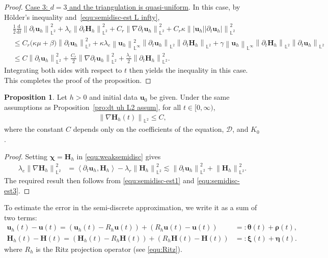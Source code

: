 \documentclass[11pt, reqno]{amsart}
\theoremstyle{definition}
\newtheorem{proposition}[theorem]{Proposition}
\theoremstyle{remark}
\numberwithin{equation}{section}
\newcommand{\bff}{\boldsymbol}
\newcommand{\bb}{\mathbb}
\newcommand{\ddt}{\frac{\mathrm{d}}{\mathrm{d}t}}
\newcommand{\norm}[2]{\left\|{#1}\right\|_{#2}}
\newcommand{\inpro}[2]{\left\langle#1,#2\right\rangle}
\begin{document}
\begin{proof}
\medskip
\noindent
\underline{Case 3: $d=3$ and the triangulation is quasi-uniform}. In this case, by H\"older's inequality and~\eqref{equ:semidisc-est L infty},
\begin{align*}
	&\frac{1}{2} \ddt \norm{\partial_t \bff{u}_h}{\bb{L}^2}^2
	+
	\lambda_e \norm{\partial_t \bff{H}_h}{\bb{L}^2}^2
	+
	C_r \norm{\nabla \partial_t \bff{u}_h}{\bb{L}^2}^2
	+
	C_r\kappa \norm{|\bff{u}_h| |\partial_t \bff{u}_h|}{\bb{L}^2}^2
	\\
	&\leq
	C_r \big(\kappa\mu+\beta\big) \norm{\partial_t \bff{u}_h}{\bb{L}^2}^2
	+
	\kappa \lambda_e \norm{\bff{u}_h}{\bb{L}^\infty}^2
	\norm{\partial_t \bff{u}_h}{\bb{L}^2}
	\norm{\partial_t \bff{H}_h}{\bb{L}^2}
	+
	\gamma \norm{\bff{u}_h}{\bb{L}^\infty}
	\norm{\partial_t \bff{H}_h}{\bb{L}^2}
	\norm{\partial_t \bff{u}_h}{\bb{L}^2}
	\\
	&\leq
	C \norm{\partial_t \bff{u}_h}{\bb{L}^2}^2
	+
	\frac{C_r}{2} \norm{\nabla \partial_t \bff{u}_h}{\bb{L}^2}^2
	+
	\frac{\lambda_e}{2} \norm{\partial_t \bff{H}_h}{\bb{L}^2}^2.
\end{align*}
Integrating both sides with respect to $t$ then yields the inequality in this case.
This completes the proof of the proposition.
\end{proof}

\begin{proposition}
Let $h>0$ and initial data $\bff{u}_0$ be given. Under the same assumptions as Proposition~\ref{pro:dt uh L2 assum}, for all $t\in [0,\infty)$,
\begin{align*}
	\norm{\nabla \bff{H}_h(t)}{\bb{L}^2}
	\leq
	C,
\end{align*}
where the constant $C$ depends only on the coefficients of the equation, $\mathscr{D}$, and $K_0$.
\end{proposition}

\begin{proof}
Setting $\bff{\chi}=\bff{H}_h$ in \eqref{equ:weaksemidisc} gives
\begin{align*}
	\lambda_e \norm{\nabla \bff{H}_h}{\bb{L}^2}^2
	&=
	\inpro{\partial_t \bff{u}_h}{\bff{H}_h}
	-
	\lambda_r \norm{\bff{H}_h}{\bb{L}^2}^2
	\lesssim
	\norm{\partial_t \bff{u}_h}{\bb{L}^2}^2
	+
	\norm{\bff{H}_h}{\bb{L}^2}^2.
\end{align*}
The required result then follows from \eqref{equ:semidisc-est1} and \eqref{equ:semidisc-est3}.
\end{proof}

To estimate the error in the semi-discrete approximation, we write it as a sum of two terms:
\begin{align}\label{equ:theta rho}
	\bff{u}_h(t) - \bff{u}(t) 
	= 
	(\bff{u}_h(t)- R_h \bff{u}(t)) + (R_h \bff{u}(t) - \bff{u}(t)) 
	&=: \bff{\theta}(t) + \bff{\rho}(t),
	\\
	\label{equ:xi eta}
	\bff{H}_h(t) - \bff{H}(t) 
	= 
	(\bff{H}_h(t)- R_h \bff{H}(t)) + (R_h \bff{H}(t) - \bff{H}(t)) 
	&=: \bff{\xi}(t) + \bff{\eta}(t).
\end{align}
where $R_h$ is the Ritz projection operator (see \eqref{equ:Ritz}).
\end{document}
